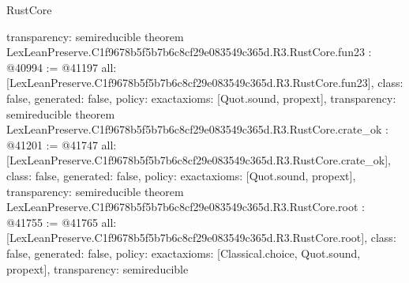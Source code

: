 \begin{lexlean}{RustCore}
\begin{coremodule}
{  transparency: semireducible
}
theorem LexLeanPreserve.C1f9678b5f5b7b6c8cf29e083549c365d.R3.RustCore.fun23 : @40994 := @41197 {
  all: [LexLeanPreserve.C1f9678b5f5b7b6c8cf29e083549c365d.R3.RustCore.fun23],
  class: false,
  generated: false,
  policy: exact{axioms: [Quot.sound, propext]},
  transparency: semireducible
}
theorem LexLeanPreserve.C1f9678b5f5b7b6c8cf29e083549c365d.R3.RustCore.crate_ok : @41201 := @41747 {
  all: [LexLeanPreserve.C1f9678b5f5b7b6c8cf29e083549c365d.R3.RustCore.crate_ok],
  class: false,
  generated: false,
  policy: exact{axioms: [Quot.sound, propext]},
  transparency: semireducible
}
theorem LexLeanPreserve.C1f9678b5f5b7b6c8cf29e083549c365d.R3.RustCore.root : @41755 := @41765 {
  all: [LexLeanPreserve.C1f9678b5f5b7b6c8cf29e083549c365d.R3.RustCore.root],
  class: false,
  generated: false,
  policy: exact{axioms: [Classical.choice, Quot.sound, propext]},
  transparency: semireducible
}


\end{coremodule}
\end{lexlean}

